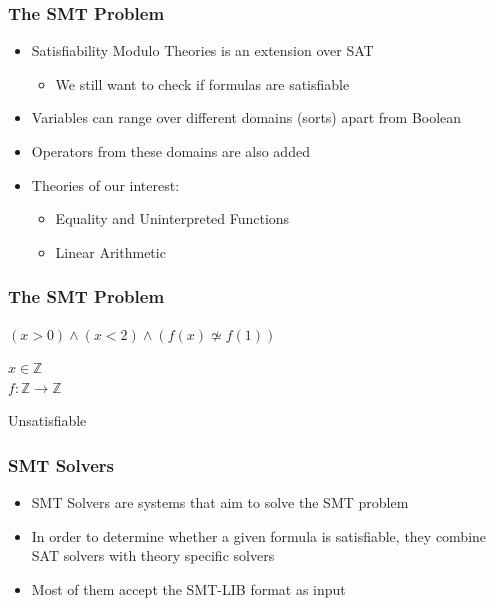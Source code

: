 \documentclass[usepdftitle=false,aspectratio=169,usenames,dvipsnames]{beamer}
\newcommand\vitem{\vfill\item}
\begin{document}
\begin{frame}
  \frametitle{The SMT Problem}
  \begin{itemize}
    \item Satisfiability Modulo Theories is an extension over SAT
    \begin{itemize}
      \item We still want to check if formulas are satisfiable
    \end{itemize}
    \vitem Variables can range over different domains (sorts) apart from Boolean
    \vitem Operators from these domains are also added
    \vitem Theories of our interest:
    \begin{itemize}
      \item Equality and Uninterpreted Functions
      \item Linear Arithmetic
    \end{itemize}
  \end{itemize}
\end{frame}


\begin{frame}
  \frametitle{The SMT Problem}
  \begin{overprint}
    \medskip
    \begin{center}
      $(x > 0) \wedge (x < 2) \wedge (f(x) \not\simeq f(1))$

      $x \in \mathbb{Z}$ \\

      $f : \mathbb{Z} \rightarrow \mathbb{Z}$
    \end{center}
  \end{overprint}
  \vfill
  \begin{overprint}
    \begin{center}
      \color{red}Unsatisfiable
    \end{center}
  \end{overprint}
\end{frame}

\begin{frame}
  \frametitle{SMT Solvers}
  \begin{itemize}
    \item SMT Solvers are systems that aim to solve the SMT problem
    \vitem In order to determine whether a given formula is satisfiable, they combine SAT solvers with theory specific solvers
    \vitem Most of them accept the SMT-LIB format as input
  \end{itemize}
\end{frame}
\end{document}
